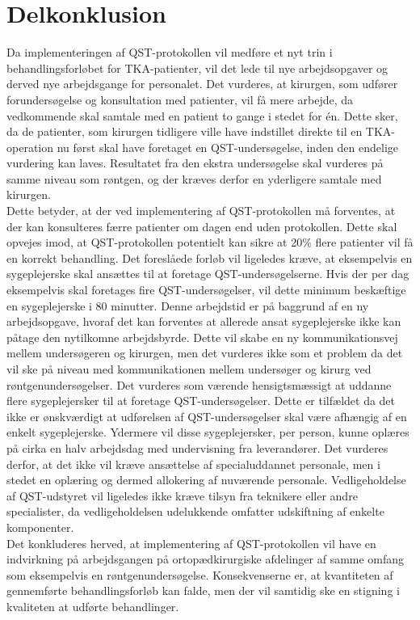\section{Delkonklusion}
Da implementeringen af QST-protokollen vil medføre et nyt trin i behandlingsforløbet for TKA-patienter, vil det lede til nye arbejdsopgaver og derved nye arbejdsgange for personalet. Det vurderes, at kirurgen, som udfører forundersøgelse og konsultation med patienter, vil få mere arbejde, da vedkommende skal samtale med en patient to gange i stedet for én. Dette sker, da de patienter, som kirurgen tidligere ville have indstillet direkte til en TKA-operation nu først skal have foretaget en QST-undersøgelse, inden den endelige vurdering kan laves. Resultatet fra den ekstra undersøgelse skal vurderes på samme niveau som røntgen, og der kræves derfor en yderligere samtale med kirurgen. \\
Dette betyder, at der ved implementering af QST-protokollen må forventes, at der kan konsulteres færre patienter om dagen end uden protokollen. Dette skal opvejes imod, at QST-protokollen potentielt kan sikre at 20\% flere patienter vil få en korrekt behandling. Det foreslåede forløb vil ligeledes kræve, at eksempelvis en sygeplejerske skal ansættes til at foretage QST-undersøgelserne. Hvis der per dag eksempelvis skal foretages fire QST-undersøgelser, vil dette minimum beskæftige en sygeplejerske i 80 minutter. Denne arbejdstid er på baggrund af en ny arbejdsopgave, hvoraf det kan forventes at allerede ansat sygeplejerske ikke kan påtage den nytilkomne arbejdsbyrde. Dette vil skabe en ny kommunikationsvej mellem undersøgeren og kirurgen, men det vurderes ikke som et problem da det vil ske på niveau med kommunikationen mellem undersøger og kirurg ved røntgenundersøgelser. Det vurderes som værende hensigtsmæssigt at uddanne flere sygeplejersker til at foretage QST-undersøgelser. Dette er tilfældet da det ikke er ønskværdigt at udførelsen af QST-undersøgelser skal være afhængig af en enkelt sygeplejerske. Ydermere vil disse sygeplejersker, per person, kunne oplæres på cirka en halv arbejdsdag med undervisning fra leverandører. Det vurderes derfor, at det ikke vil kræve ansættelse af specialuddannet personale, men i stedet en oplæring og dermed allokering af nuværende personale. Vedligeholdelse af QST-udstyret vil ligeledes ikke kræve tilsyn fra teknikere eller andre specialister, da vedligeholdelsen udelukkende omfatter udskiftning af enkelte komponenter. \\
Det konkluderes herved, at implementering af QST-protokollen vil have en indvirkning på arbejdsgangen på ortopædkirurgiske afdelinger af samme omfang som eksempelvis en røntgenundersøgelse. Konsekvenserne er, at kvantiteten af gennemførte behandlingsforløb kan falde, men der vil samtidig ske en stigning i kvaliteten at udførte behandlinger.
